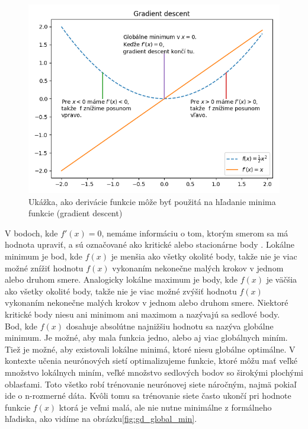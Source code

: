 \begin{figure}[H]
	\centering
	\includegraphics[width=1\linewidth]{img/gd}
	\caption{Ukážka, ako derivácie funkcie môže byť použitá na hľadanie minima funkcie (gradient descent)}
	\label{fig:gd}
\end{figure}

\indent V bodoch, kde $f'(x) = 0$, nemáme informáciu o tom, ktorým smerom sa má hodnota upraviť, a sú označované ako kritické alebo stacionárne body \cite{goodfellow2016deep}.
Lokálne minimum je bod, kde $f(x)$ je menšia ako všetky okolité body, takže nie je viac možné znížiť
hodnotu $f(x)$ vykonaním nekonečne malých krokov v jednom alebo druhom smere.
Analogicky lokálne maximum je body, kde $f(x)$ je väčšia ako všetky okolité body, takže nie je viac možné zvýšiť hodnotu $f(x)$ vykonaním nekonečne malých krokov v jednom alebo druhom smere.
Niektoré kritické body niesu ani minimom ani maximom a nazývajú sa sedlové body.\\

\indent Bod, kde $f(x)$ dosahuje absolútne najnižšiu hodnotu sa nazýva globálne minimum.
Je možné, aby mala funkcia jedno, alebo aj viac globálnych miním.
Tiež je možné, aby existovali lokálne minimá, ktoré niesu globálne optimálne.
V kontexte učenia neurónových sietí optimalizujeme funkcie, ktoré môžu mať veľké množstvo lokálnych miním, veľké množstvo sedlových bodov so širokými plochými oblasťami.
Toto všetko robí trénovanie neurónovej siete náročným, najmä pokiaľ ide o n-rozmerné dáta.
Kvôli tomu sa trénovanie siete často ukončí pri hodnote funkcie $f(x)$ ktorá je veľmi malá, ale 
nie nutne minimálne z formálneho hľadiska, ako vidíme na obrázku\ref{fig:gd_global_min}. \cite{goodfellow2016deep}

